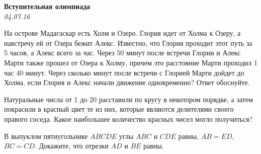 \begin{center}
\textbf{\Large Вступительная олимпиада}\\
\textit{04.07.16}
\end{center}


\begin{problems}

\item На острове Мадагаскар есть Холм и Озеро. Глория идет от Холма к Озеру, а навстречу ей от Озера бежит Алекс. Известно, что Глория проходит этот путь за 5 часов, а Алекс всего за час. Через 50 минут после встречи Глории и Алекс Марти также прошел от Озера к Холму, причем это расстояние Марти проходил 1 час 40 минут. Через сколько минут после встречи с Глорией Марти дойдет до Холма, если Глория и Алекс начали движение одновременно? Ответ обоснуйте.




\item Натуральные числа от 1 до 20 расставили по кругу в некотором порядке, а затем покрасили в красный цвет те из них, которые являются делителями своего правого соседа. Какое наибольшее количество красных чисел могло получиться?

\item В выпуклом пятиугольнике $ABCDE$ углы $ABC$ и $CDE$ равны, $AB=ED$, $BC=CD$. Докажите, что отрезки $AD$ и $BE$ равны.


\end{problems}

